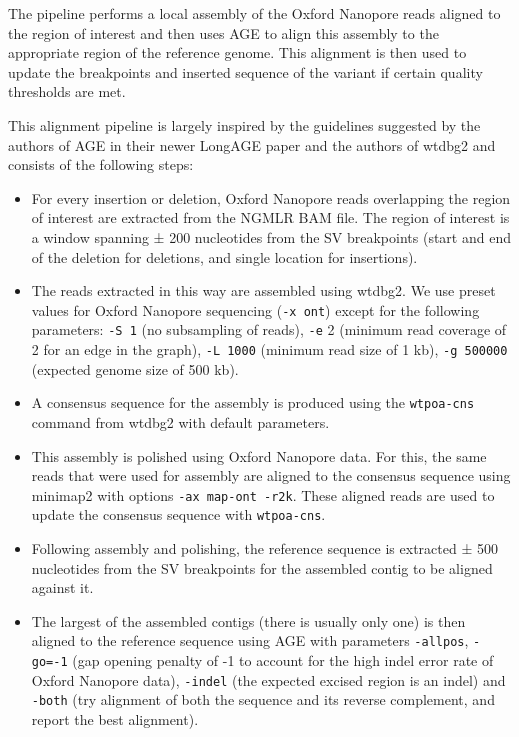 \documentclass[12pt]{article}
\begin{document}
The pipeline performs a local assembly of the Oxford Nanopore reads aligned to the region of interest and then uses AGE \citep{age} to align this assembly to the appropriate region of the reference genome.
This alignment is then used to update the breakpoints and inserted sequence of the variant if certain quality thresholds are met.

This alignment pipeline is largely inspired by the guidelines suggested by the authors of AGE in their newer LongAGE paper \citep{longage} and the authors of wtdbg2 \citep{wtdbg2} and consists of the following steps:

\begin{itemize}
	\item For every insertion or deletion, Oxford Nanopore reads overlapping the region of interest are extracted from the NGMLR \citep{ngmlr} BAM file. 
		The region of interest is a window spanning ± 200 nucleotides from the SV breakpoints (start and end of the deletion for deletions, and single location for insertions).
\item  The reads extracted in this way are assembled using wtdbg2. 
	We use preset values for Oxford Nanopore sequencing (\texttt{-x ont}) except for the following parameters: \texttt{-S 1} (no subsampling of reads), \texttt{-e} 2 (minimum read coverage of 2 for an edge in the graph), \texttt{-L 1000} (minimum read size of 1 kb), \texttt{-g 500000} (expected genome size of 500 kb).
\item A consensus sequence for the assembly is produced using the \texttt{wtpoa-cns} command from wtdbg2 with default parameters.
\item This assembly is polished using Oxford Nanopore data. For this, the same reads that were used for assembly are aligned to the consensus sequence using minimap2 \citep{minimap2} with options \texttt{-ax map-ont -r2k}. These aligned reads are used to update the consensus sequence with \texttt{wtpoa-cns}.
\item Following assembly and polishing, the reference sequence is extracted ± 500 nucleotides from the SV breakpoints for the assembled contig to be aligned against it.
\item The largest of the assembled contigs (there is usually only one) is then aligned to the reference sequence using AGE with parameters \texttt{-allpos}, \texttt{-go=-1} (gap opening penalty of -1 to account for the high indel error rate of Oxford Nanopore data), \texttt{-indel} (the expected excised region is an indel) and \texttt{-both} (try alignment of both the sequence and its reverse complement, and report the best alignment).
\end{itemize}
\end{document}
